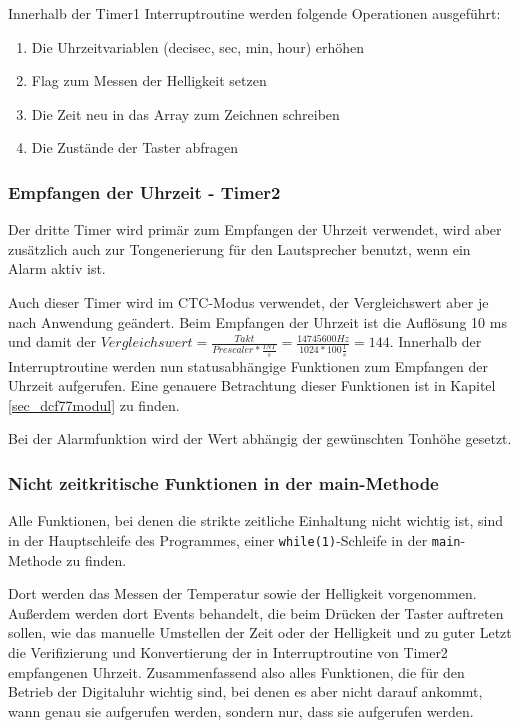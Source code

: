Innerhalb der Timer1 Interruptroutine werden folgende Operationen ausgeführt:
\begin{enumerate}
  \item Die Uhrzeitvariablen (decisec, sec, min, hour) erhöhen
  \item Flag zum Messen der Helligkeit setzen
  \item Die Zeit neu in das Array zum Zeichnen schreiben
  \item Die Zustände der Taster abfragen
\end{enumerate}

\subsubsection{Empfangen der Uhrzeit - Timer2}
Der dritte Timer wird primär zum Empfangen der Uhrzeit verwendet, wird aber zusätzlich auch zur Tongenerierung für den Lautsprecher benutzt, wenn ein Alarm aktiv ist.

Auch dieser Timer wird im CTC-Modus verwendet, der Vergleichswert aber je nach Anwendung geändert. Beim Empfangen der Uhrzeit ist die Auflösung 10 ms und damit der $Vergleichswert = \frac{Takt}{Prescaler * \frac{INT}{s}} = \frac{14745600 Hz}{1024 * 100 \frac{1}{s}} = 144$. Innerhalb der Interruptroutine werden nun statusabhängige Funktionen zum Empfangen der Uhrzeit aufgerufen. Eine genauere Betrachtung dieser Funktionen ist in Kapitel \ref{sec_dcf77modul} zu finden.

Bei der Alarmfunktion wird der Wert abhängig der gewünschten Tonhöhe gesetzt.

\subsubsection{Nicht zeitkritische Funktionen in der main-Methode}
Alle Funktionen, bei denen die strikte zeitliche Einhaltung nicht wichtig ist, sind in der Hauptschleife des Programmes, einer \texttt{while(1)}-Schleife in der \texttt{main}-Methode zu finden.

Dort werden das Messen der Temperatur sowie der Helligkeit vorgenommen. Außerdem werden dort Events behandelt, die beim Drücken der Taster auftreten sollen, wie das manuelle Umstellen der Zeit oder der Helligkeit und zu guter Letzt die Verifizierung und Konvertierung der in Interruptroutine von Timer2 empfangenen Uhrzeit. Zusammenfassend also alles Funktionen, die für den Betrieb der Digitaluhr wichtig sind, bei denen es aber nicht darauf ankommt, wann genau sie aufgerufen werden, sondern nur, dass sie aufgerufen werden. 
%
%
%
